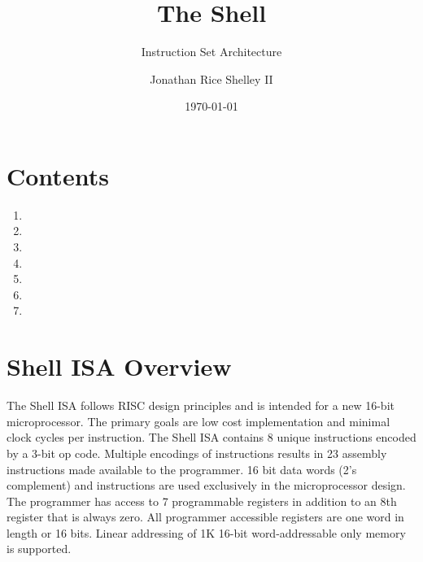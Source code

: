 \documentclass{article}
\subtitle{Instruction Set Architecture}
\title{The Shell}
\author{Jonathan Rice Shelley II}
\date{\today}
\begin{document}
\maketitle

\section{Contents}
\begin{par}
	\begin{enumerate}
	\item {}
	\item {}
	\item {}
	\item {}
	\item {} 
	\item {}
	\item {}
	\end{enumerate}
\end{par}

\section{Shell ISA Overview}
\label{overview}
\begin{par}
	The Shell ISA follows RISC design principles and is intended for a new 16-bit microprocessor. The primary goals are low cost implementation and minimal clock cycles per instruction. The Shell ISA contains 8 unique instructions encoded by a 3-bit op code. Multiple encodings of instructions results in 23 assembly instructions made available to the programmer. 16 bit data words (2's complement) and instructions are used exclusively in the microprocessor design. The programmer has access to 7 programmable registers in addition to an 8th register that is always zero. All programmer accessible registers are one word in length or 16 bits. Linear addressing of 1K 16-bit word-addressable only memory is supported. 
\end{par}
\end{document}
